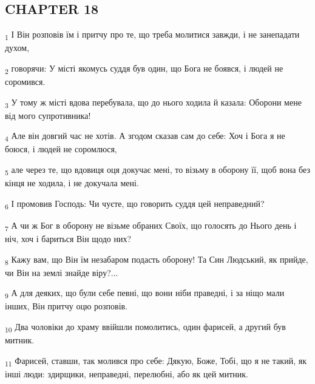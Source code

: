 \subsection{CHAPTER 18}
\begin{tcolorbox}
\textsubscript{1} І Він розповів їм і притчу про те, що треба молитися завжди, і не занепадати духом,
\end{tcolorbox}
\begin{tcolorbox}
\textsubscript{2} говорячи: У місті якомусь суддя був один, що Бога не боявся, і людей не соромився.
\end{tcolorbox}
\begin{tcolorbox}
\textsubscript{3} У тому ж місті вдова перебувала, що до нього ходила й казала: Оборони мене від мого супротивника!
\end{tcolorbox}
\begin{tcolorbox}
\textsubscript{4} Але він довгий час не хотів. А згодом сказав сам до себе: Хоч і Бога я не боюся, і людей не соромлюся,
\end{tcolorbox}
\begin{tcolorbox}
\textsubscript{5} але через те, що вдовиця оця докучає мені, то візьму в оборону її, щоб вона без кінця не ходила, і не докучала мені.
\end{tcolorbox}
\begin{tcolorbox}
\textsubscript{6} І промовив Господь: Чи чуєте, що говорить суддя цей неправедний?
\end{tcolorbox}
\begin{tcolorbox}
\textsubscript{7} А чи ж Бог в оборону не візьме обраних Своїх, що голосять до Нього день і ніч, хоч і бариться Він щодо них?
\end{tcolorbox}
\begin{tcolorbox}
\textsubscript{8} Кажу вам, що Він їм незабаром подасть оборону! Та Син Людський, як прийде, чи Він на землі знайде віру?...
\end{tcolorbox}
\begin{tcolorbox}
\textsubscript{9} А для деяких, що були себе певні, що вони ніби праведні, і за ніщо мали інших, Він притчу оцю розповів.
\end{tcolorbox}
\begin{tcolorbox}
\textsubscript{10} Два чоловіки до храму ввійшли помолитись, один фарисей, а другий був митник.
\end{tcolorbox}
\begin{tcolorbox}
\textsubscript{11} Фарисей, ставши, так молився про себе: Дякую, Боже, Тобі, що я не такий, як інші люди: здирщики, неправедні, перелюбні, або як цей митник.
\end{tcolorbox}
